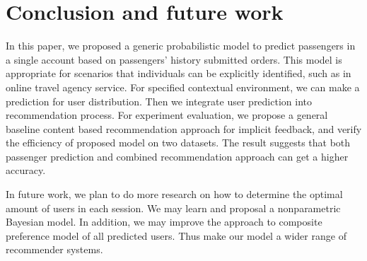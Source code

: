 \documentclass{sig-alternate-05-2015}
\begin{document}
\section{Conclusion and future work}
In this paper, we proposed a generic probabilistic model to predict passengers in a single account based on passengers' history submitted orders. This model is appropriate for scenarios that individuals can be explicitly identified, such as in online travel agency service. For specified contextual environment, we can make a prediction for user distribution. Then we integrate user prediction into recommendation process. For experiment evaluation, we propose a general baseline content based recommendation approach for implicit feedback, and verify the efficiency of proposed model on two datasets. The result suggests that both passenger prediction and combined recommendation approach can get a higher accuracy. \par
In future work, we plan to do more research on how to determine the optimal amount of users in each session. We may learn and proposal a nonparametric Bayesian model. In addition, we may improve the approach to composite preference model of all predicted users. Thus make our model a wider range of recommender systems.



%

%
\end{document}
